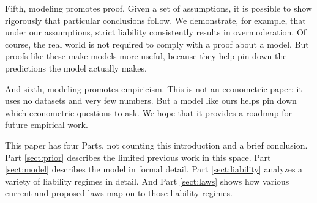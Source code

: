 Fifth, modeling promotes proof. Given a set of assumptions, it is possible to show rigorously that particular conclusions follow. We demonstrate, for example, that under our assumptions, strict liability consistently results in overmoderation. Of course, the real world is not required to comply with a proof about a model. But proofs like these make models more useful, because they help pin down the predictions the model actually makes.

And sixth, modeling promotes empiricism. This is not an econometric paper; it uses no datasets and very few numbers. But a model like ours helps pin down which econometric questions to ask. We hope that it provides a roadmap for future empirical work.

This paper has four Parts, not counting this introduction and a brief conclusion. Part \ref{sect:prior} describes the limited previous work in this space. Part \ref{sect:model} describes the model in formal detail. Part \ref{sect:liability} analyzes a variety of liability regimes in detail. And Part \ref{sect:laws} shows how various current and proposed laws map on to those liability regimes.